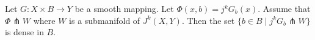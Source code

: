 Let $G: X \times B \to Y$ be a smooth mapping. Let $\Phi(x, b) = j^k G_b(x)$. Assume that $\Phi \pitchfork W$ where $W$ is a submanifold of $J^k(X, Y)$. Then the set $\{b \in B \mid j^k G_b \pitchfork W\}$ is dense in $B$.